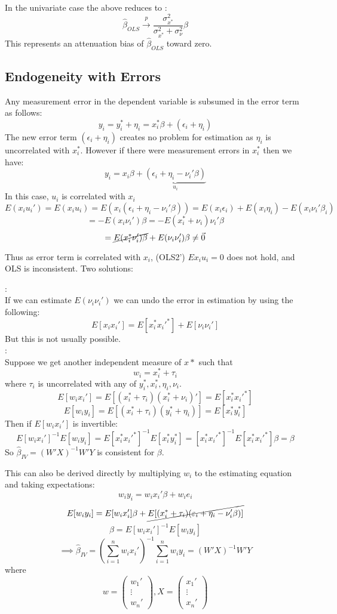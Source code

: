 \documentclass[DIV=14,titlepage=false]{scrreprt}
\begin{document}
In the univariate case the above reduces to :
\[\hat\beta_{OLS}\xrightarrow{p}\frac{\sigma^2_{x^*}}{\sigma^2_{x^*}+\sigma^2_{\nu}}\beta\]
This represents an attenuation bias of \(\hat\beta_{OLS}\) toward zero.

\subsection{Endogeneity with Errors}
Any measurement error in the dependent variable is subsumed in the error term as follows:
\[y_i=y_i^*+\eta_i=x_i^*\beta+(\epsilon_i+\eta_i)\]
The new error term \((\epsilon_i+\eta_i)\) creates no problem for estimation as \(\eta_i\) is uncorrelated with \(x_i^*\). However if there were measurement errors in \(x_i^*\) then we have:
\[y_i=x_i\beta+\underbrace{(\epsilon_i+\eta_i-\nu_i'\beta)}_{u_i}\]
In this case, \(u_i\) is correlated with \(x_i\)
\[E(x_iu_i')=E(x_iu_i)=E(x_i(\epsilon_i+\eta_i-\nu_i'\beta))=E(x_i\epsilon_i)+E(x_i\eta_i)-E(x_i\nu_i'\beta_i)\]
\[=-E(x_i\nu_i')\beta=-E(x_i^*+\nu_i)\nu_i'\beta\]
\[=\cancel{E(x_i^*\nu_i')\beta}+E(\nu_i\nu_i')\beta\neq\vec{0}\]

Thus as error term is correlated with \(x_i\), (OLS2') \(Ex_iu_i=0\) does not hold, and OLS is inconsistent.
Two solutions:

\underline{}:\\
If we can estimate \(E(\nu_i\nu_i')\) we can undo the error in estimation by using the following:
\[E[x_ix_i']=E[x_i^*x_i'^*]+E[\nu_i\nu_i']\]
But this is not usually possible.
\\ \underline{}:\\
Suppose we get another independent measure of \(x*\) such that
\[w_i=x_i^*+\tau_i\]
where \(\tau_i\) is uncorrelated with any of \(y_i^*,x_i^*,\eta_i,\nu_i\).
\[E[w_ix_i']=E[(x_i^*+\tau_i)(x_i^*+\nu_i)']=E[x_i^*x_i'^*]\]
\[E[w_iy_i]= E[(x_i^*+\tau_i)(y_i^*+\eta_i)]=E[x_i^*y_i^*]\]
Then if \(E[w_ix_i']\) is invertible:
\[E[w_ix_i']^{-1}E[w_iy_i]=E[x_i^*x_i'^*]^{-1}E[x_i^*y_i^*]=[x_i^*x_i'^*]^{-1}E[x_i^*x_i'^*]\beta=\beta\]
So \(\hat\beta_{IV} = (W'X)^{-1}W'Y\) is consistent for \(\beta\).

This can also be derived directly by multiplying \(w_i\) to the estimating equation and taking expectations:
\[w_iy_i=w_ix_i'\beta+w_ie_i\]
\[E[w_iy_i]=E[w_ix_i']\beta+\cancel{E[(x_i^*+\tau_i)(\epsilon_i+\eta_i-\nu_i'\beta)]}\]
\[\beta=E[w_ix_i']^{-1}E[w_iy_i]\]
\[\implies \hat\beta_{IV}=(\sum_{i=1}^nw_ix_i')^{-1}\sum_{i=1}^nw_iy_i=(W'X)^{-1}W'Y\]
where
\[w=\begin{pmatrix}
    w_1'\\
    \vdots\\
    w_n'
\end{pmatrix}, X=\begin{pmatrix}
    x_1'\\
    \vdots\\
    x_n'
\end{pmatrix}\]
\end{document}
